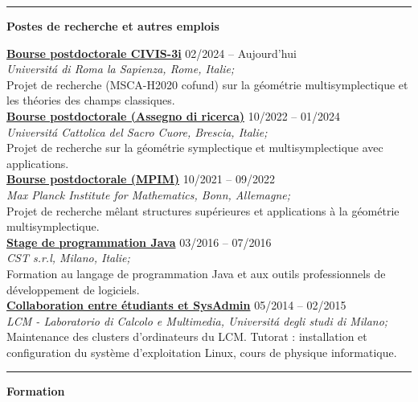 \documentclass[a4paper]{article}
\newcommand{\block}[1]{\hrule \vspace{0.2cm} \textbf{\Large #1} \vspace{0.2cm}}
\newcommand{\voice}[5]{\href{#4}{\textbf{#1}} \hfill #2 \\ \textit{#3} \\ {\small #5} \vspace{0.2cm} \\}
\begin{document}
\begin{minipage}[t]{0.6\columnwidth}
    

    \block{Postes de recherche et autres emplois}

    
    \voice{Bourse postdoctorale CIVIS-3i}
        {02/2024  -- Aujourd'hui}
        {Universit\'a di Roma la Sapienza, Rome, Italie;}
        {https://civis3i.univ-amu.fr/en/civis3i-alliance-programme}       
        {Projet de recherche (MSCA-H2020 cofund) sur la géométrie multisymplectique et les théories des champs classiques.}
    \voice{Bourse postdoctorale (Assegno di ricerca)}
        {10/2022  -- 01/2024}
        {Universit\'a Cattolica del Sacro Cuore, Brescia, Italie;}
        {https://dipartimenti.unicatt.it/dmf-home}       
        {Projet de recherche sur la géométrie symplectique et multisymplectique avec applications.}
    \voice{Bourse postdoctorale (MPIM)}
        {10/2021  -- 09/2022}
        {Max Planck Institute for Mathematics, Bonn, Allemagne;}
        {https://www.mpim-bonn.mpg.de/}       
        {Projet de recherche mêlant structures supérieures et applications à la géométrie multisymplectique.}
    \voice{Stage de programmation Java}
        {03/2016  -- 07/2016}
        {CST s.r.l, Milano, Italie;}
        {https://www.csttech.it/}       
        {Formation au langage de programmation Java et aux outils professionnels de développement de logiciels.}
    \voice{Collaboration entre étudiants et SysAdmin}
        {05/2014 -- 02/2015}
        {LCM - Laboratorio di Calcolo e Multimedia, Universit\'a degli studi di Milano;}
        {https://lcm.mi.infn.it/}       
        {Maintenance des clusters d'ordinateurs du LCM. Tutorat : installation et configuration du système d'exploitation Linux, cours de physique informatique.\vspace{-0.5cm}} 




    \block{Formation}


\end{minipage}
\end{document}
